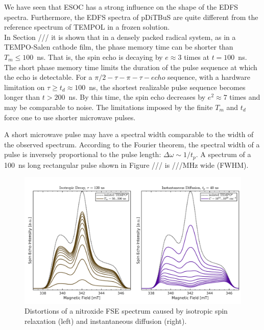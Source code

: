 We have seen that  ESOC has a strong influence on the shape of the EDFS spectra. Furthermore, the EDFS spectra of pDiTBuS are quite different from the reference spectrum of TEMPOL in a  frozen solution.\\


In Section /// it is shown that in a densely packed radical system, as in a TEMPO-Salen cathode film, the phase memory time can be shorter than $T_m\leq100$~ns. That is, the spin echo is decaying by $e\approx3$ times at $t=100$~ns. The short phase memory time limits the duration of the pulse sequence at which the echo is detectable. For a $\pi/2-\tau-\pi-\tau-echo$ sequence, with a hardware limitation on $\tau\geq t_d\approx100$~ns, the shortest realizable pulse sequence becomes longer than $t>200$~ns. By this time, the spin echo decreases by $e^2\approx7$ times and may be comparable to noise. The limitations imposed by the finite $T_m$ and $t_d$ force one to use shorter microwave pulses. 
\par
A short microwave pulse may have a spectral width comparable to the width of the observed spectrum. According to the Fourier theorem, the spectral width of a pulse is inversely proportional to the pulse length: $\Delta\omega\sim 1/t_p$. A spectrum of a 100~ns long rectangular pulse shown in Figure /// is ///MHz wide (FWHM). 

\begin{figure}[h]
\center
	\includegraphics[width=1\textwidth]{./pulse/figures/FGMR/ID/ID_vs_ISO.pdf}
	\caption{Distortions of a nitroxide FSE spectrum caused by isotropic spin relaxation (left) and instantaneous diffusion (right).}
	\label{fig:iso_vs_id}
\end{figure}











